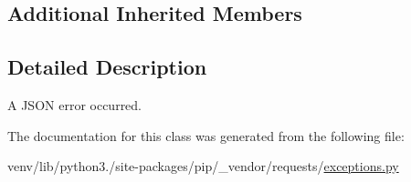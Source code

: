 \subsection*{Additional Inherited Members}


\subsection{Detailed Description}
\begin{DoxyVerb}A JSON error occurred.\end{DoxyVerb}
 

The documentation for this class was generated from the following file\+:\begin{DoxyCompactItemize}
\item 
venv/lib/python3./site-\/packages/pip/\+\_\+vendor/requests/\hyperlink{pip_2__vendor_2requests_2exceptions_8py}{exceptions.\+py}\end{DoxyCompactItemize}
